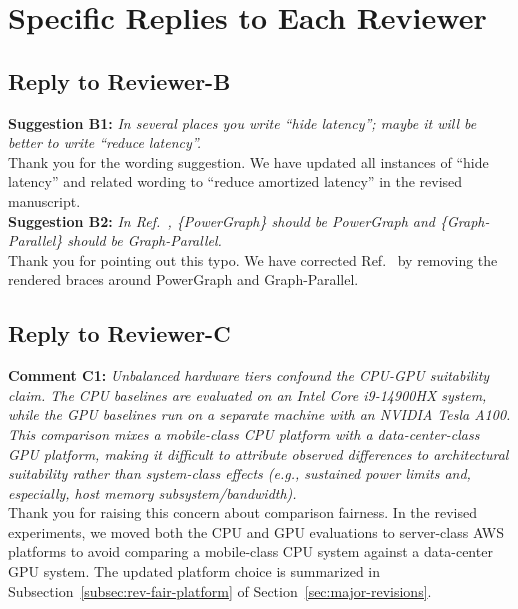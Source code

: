 \section{Specific Replies to Each Reviewer}
\label{sec:specific-replies}

\subsection{Reply to Reviewer-B}

\noindent\textbf{Suggestion B1:} \textit{In several places you write ``hide latency''; maybe it will be better to write ``reduce latency''.} 
\\

\noindent Thank you for the wording suggestion. We have updated all instances of ``hide latency'' and related wording to ``reduce amortized latency'' in the revised manuscript.
\\

\noindent\textbf{Suggestion B2:} \textit{In Ref.~\cite{gonzalez2012powergraph}, \{PowerGraph\} should be PowerGraph and \{Graph-Parallel\} should be Graph-Parallel.}
\\

\noindent Thank you for pointing out this typo. We have corrected Ref.~\cite{gonzalez2012powergraph} by removing the rendered braces around PowerGraph and Graph-Parallel.
\\

\subsection{Reply to Reviewer-C}

\noindent\textbf{Comment C1:} \textit{Unbalanced hardware tiers confound the CPU-GPU suitability claim. The CPU baselines are evaluated on an Intel Core i9-14900HX system, while the GPU baselines run on a separate machine with an NVIDIA Tesla A100. This comparison mixes a mobile-class CPU platform with a data-center-class GPU platform, making it difficult to attribute observed differences to architectural suitability rather than system-class effects (e.g., sustained power limits and, especially, host memory subsystem/bandwidth).}
\\

\noindent Thank you for raising this concern about comparison fairness. In the revised experiments, we moved both the CPU and GPU evaluations to server-class AWS platforms to avoid comparing a mobile-class CPU system against a data-center GPU system. The updated platform choice is summarized in Subsection~\ref{subsec:rev-fair-platform} of Section~\ref{sec:major-revisions}.
\\

